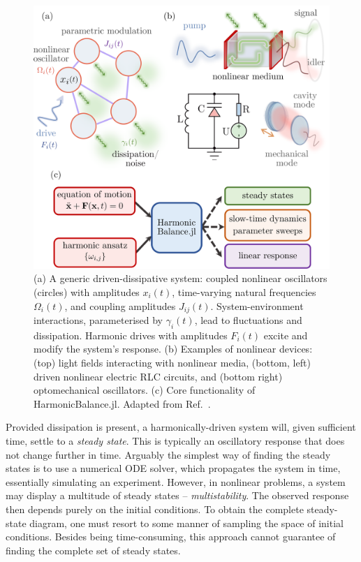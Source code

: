 \begin{figure} [ht!]
	\centering
	\includegraphics[width=\textwidth]{figures/intro/flow_diag.png}
	\caption{(a) A generic driven-dissipative system: coupled nonlinear oscillators (circles) with amplitudes $x_i(t)$, time-varying natural frequencies $\Omega_i(t)$, and coupling amplitudes $J_{ij}(t)$. System-environment interactions, parameterised by $\gamma_i(t)$, lead to fluctuations and dissipation. Harmonic drives with amplitudes $F_i(t)$ excite and modify the system's response. (b) Examples of nonlinear devices: (top) light fields interacting with nonlinear media, (bottom, left) driven nonlinear electric RLC circuits, and (bottom right) optomechanical oscillators. (c) Core functionality of HarmonicBalance.jl. Adapted from Ref.~\cite{Kosata_2022b}.}
	\label{fig:intro_setup}
\end{figure} 

Provided dissipation is present, a harmonically-driven system will, given sufficient time, settle to a \textit{steady state}. This is typically an oscillatory response that does not change further in time. Arguably the simplest way of finding the steady states is to use a numerical ODE solver, which propagates the system in time, essentially simulating an experiment. However, in nonlinear problems, a system may display a multitude of steady states -- \textit{multistability}. The observed response then depends purely on the initial conditions. To obtain the complete steady-state diagram, one must resort to some manner of sampling the space of initial conditions. Besides being time-consuming, this approach cannot guarantee of finding the complete set of steady states.

